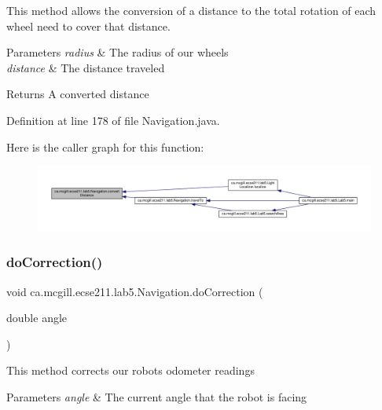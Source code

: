 This method allows the conversion of a distance to the total rotation of each wheel need to cover that distance.


\begin{DoxyParams}{Parameters}
{\em radius} & The radius of our wheels \\
\hline
{\em distance} & The distance traveled \\
\hline
\end{DoxyParams}
\begin{DoxyReturn}{Returns}
A converted distance 
\end{DoxyReturn}


Definition at line 178 of file Navigation.\+java.

Here is the caller graph for this function\+:
\nopagebreak
\begin{figure}[H]
\begin{center}
\leavevmode
\includegraphics[width=350pt]{classca_1_1mcgill_1_1ecse211_1_1lab5_1_1_navigation_a85122ad723d0988c118866f367073be6_icgraph}
\end{center}
\end{figure}
\mbox{\label{classca_1_1mcgill_1_1ecse211_1_1lab5_1_1_navigation_a73a89ddd822e0ba1cfd7a29c18aa7aea}} 
\subsubsection{\texorpdfstring{do\+Correction()}{doCorrection()}}
{\footnotesize\ttfamily void ca.\+mcgill.\+ecse211.\+lab5.\+Navigation.\+do\+Correction (\begin{DoxyParamCaption}\item[{double}]{angle }\end{DoxyParamCaption})}

This method corrects our robot\textquotesingle{}s odometer readings


\begin{DoxyParams}{Parameters}
{\em angle} & The current angle that the robot is facing \\
\hline
\end{DoxyParams}


